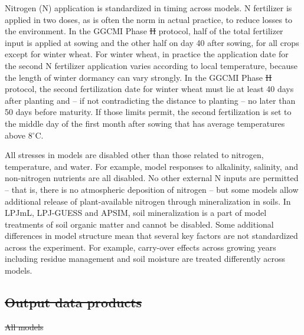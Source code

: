 \documentclass[gmd, manuscript]{copernicus} %
\providecommand{\DIFadd}[1]{{\protect\color{blue}\uwave{#1}}} %
\providecommand{\DIFdel}[1]{{\protect\color{red}\sout{#1}}}                      %
\providecommand{\DIFaddbegin}{} %
\providecommand{\DIFaddend}{} %
\providecommand{\DIFdelbegin}{} %
\providecommand{\DIFdelend}{} %
\begin{document}
Nitrogen (N) application is standardized in timing across models. 
N fertilizer is applied in two doses, as is often the norm in actual practice, to reduce losses to the environment. 
In the GGCMI Phase \DIFdelbegin \DIFdel{II }\DIFdelend \DIFaddbegin \DIFadd{2 }\DIFaddend protocol, half of the total fertilizer input is applied at sowing and the other half on day 40 after sowing, for all crops except for winter wheat. 
For winter wheat, in practice the application date for the second N fertilizer application varies according to local temperature, because the length of winter dormancy can vary strongly. 
In the GGCMI Phase \DIFdelbegin \DIFdel{II }\DIFdelend \DIFaddbegin \DIFadd{2 }\DIFaddend protocol, the second fertilization date for winter wheat must lie at least 40 days after planting and -- if not contradicting the distance to planting -- no later than 50 days before maturity.
If those limits permit, the second fertilization is set to the middle day of the first month after sowing that has average temperatures above 8$^\circ$C.

All stresses in models are disabled other than those related to nitrogen, temperature, and water. 
For example, model responses to alkalinity, salinity, and non-nitrogen nutrients are all disabled. 
No other external N inputs are permitted -- that is, there is no atmospheric deposition of nitrogen --  but some models allow additional release of plant-available nitrogen through mineralization in soils. 
In LPJmL, LPJ-GUESS and APSIM, soil mineralization is a part of model treatments of soil organic matter and cannot be disabled.
Some additional differences in model structure mean that several key factors are not standardized across the experiment. 
For example, carry-over effects across growing years including residue management and soil moisture are treated differently across models.


\DIFdelbegin \subsection{\DIFdel{Output data products}}
\addtocounter{subsection}{-1}%
\DIFdel{All models }\DIFdelend \DIFaddbegin \section{\DIFadd{Models contributing}}
\label{S:3}
\end{document}
